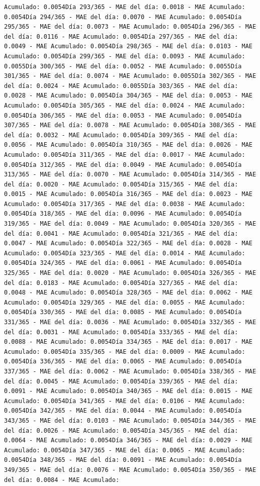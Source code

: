 \documentclass[
]{book}
\begin{document}
\begin{verbatim}
Acumulado: 0.0054Día 293/365 - MAE del día: 0.0018 - MAE Acumulado: 0.0054Día 294/365 - MAE del día: 0.0070 - MAE Acumulado: 0.0054Día 295/365 - MAE del día: 0.0073 - MAE Acumulado: 0.0054Día 296/365 - MAE del día: 0.0116 - MAE Acumulado: 0.0054Día 297/365 - MAE del día: 0.0049 - MAE Acumulado: 0.0054Día 298/365 - MAE del día: 0.0103 - MAE Acumulado: 0.0054Día 299/365 - MAE del día: 0.0093 - MAE Acumulado: 0.0055Día 300/365 - MAE del día: 0.0052 - MAE Acumulado: 0.0055Día 301/365 - MAE del día: 0.0074 - MAE Acumulado: 0.0055Día 302/365 - MAE del día: 0.0024 - MAE Acumulado: 0.0055Día 303/365 - MAE del día: 0.0028 - MAE Acumulado: 0.0054Día 304/365 - MAE del día: 0.0053 - MAE Acumulado: 0.0054Día 305/365 - MAE del día: 0.0024 - MAE Acumulado: 0.0054Día 306/365 - MAE del día: 0.0053 - MAE Acumulado: 0.0054Día 307/365 - MAE del día: 0.0078 - MAE Acumulado: 0.0054Día 308/365 - MAE del día: 0.0032 - MAE Acumulado: 0.0054Día 309/365 - MAE del día: 0.0056 - MAE Acumulado: 0.0054Día 310/365 - MAE del día: 0.0026 - MAE Acumulado: 0.0054Día 311/365 - MAE del día: 0.0017 - MAE Acumulado: 0.0054Día 312/365 - MAE del día: 0.0049 - MAE Acumulado: 0.0054Día 313/365 - MAE del día: 0.0070 - MAE Acumulado: 0.0054Día 314/365 - MAE del día: 0.0020 - MAE Acumulado: 0.0054Día 315/365 - MAE del día: 0.0015 - MAE Acumulado: 0.0054Día 316/365 - MAE del día: 0.0023 - MAE Acumulado: 0.0054Día 317/365 - MAE del día: 0.0038 - MAE Acumulado: 0.0054Día 318/365 - MAE del día: 0.0096 - MAE Acumulado: 0.0054Día 319/365 - MAE del día: 0.0049 - MAE Acumulado: 0.0054Día 320/365 - MAE del día: 0.0041 - MAE Acumulado: 0.0054Día 321/365 - MAE del día: 0.0047 - MAE Acumulado: 0.0054Día 322/365 - MAE del día: 0.0028 - MAE Acumulado: 0.0054Día 323/365 - MAE del día: 0.0014 - MAE Acumulado: 0.0054Día 324/365 - MAE del día: 0.0061 - MAE Acumulado: 0.0054Día 325/365 - MAE del día: 0.0020 - MAE Acumulado: 0.0054Día 326/365 - MAE del día: 0.0183 - MAE Acumulado: 0.0054Día 327/365 - MAE del día: 0.0048 - MAE Acumulado: 0.0054Día 328/365 - MAE del día: 0.0062 - MAE Acumulado: 0.0054Día 329/365 - MAE del día: 0.0055 - MAE Acumulado: 0.0054Día 330/365 - MAE del día: 0.0085 - MAE Acumulado: 0.0054Día 331/365 - MAE del día: 0.0036 - MAE Acumulado: 0.0054Día 332/365 - MAE del día: 0.0031 - MAE Acumulado: 0.0054Día 333/365 - MAE del día: 0.0088 - MAE Acumulado: 0.0054Día 334/365 - MAE del día: 0.0017 - MAE Acumulado: 0.0054Día 335/365 - MAE del día: 0.0009 - MAE Acumulado: 0.0054Día 336/365 - MAE del día: 0.0065 - MAE Acumulado: 0.0054Día 337/365 - MAE del día: 0.0062 - MAE Acumulado: 0.0054Día 338/365 - MAE del día: 0.0045 - MAE Acumulado: 0.0054Día 339/365 - MAE del día: 0.0091 - MAE Acumulado: 0.0054Día 340/365 - MAE del día: 0.0015 - MAE Acumulado: 0.0054Día 341/365 - MAE del día: 0.0106 - MAE Acumulado: 0.0054Día 342/365 - MAE del día: 0.0044 - MAE Acumulado: 0.0054Día 343/365 - MAE del día: 0.0103 - MAE Acumulado: 0.0054Día 344/365 - MAE del día: 0.0026 - MAE Acumulado: 0.0054Día 345/365 - MAE del día: 0.0064 - MAE Acumulado: 0.0054Día 346/365 - MAE del día: 0.0029 - MAE Acumulado: 0.0054Día 347/365 - MAE del día: 0.0065 - MAE Acumulado: 0.0054Día 348/365 - MAE del día: 0.0091 - MAE Acumulado: 0.0054Día 349/365 - MAE del día: 0.0076 - MAE Acumulado: 0.0054Día 350/365 - MAE del día: 0.0084 - MAE Acumulado: 
\end{verbatim}
\end{document}
